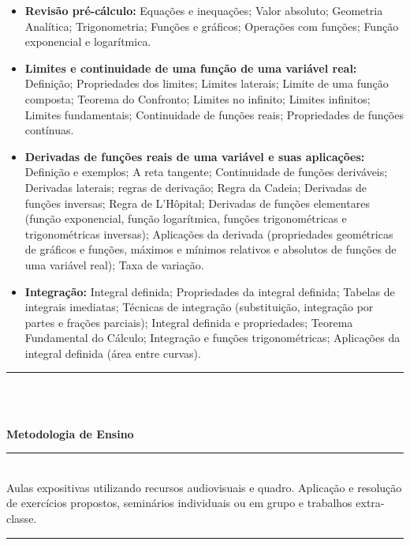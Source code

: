 \begin{itemize}
 \item \textbf{Revisão pré-cálculo:} Equações e inequações; Valor absoluto; Geometria Analítica; Trigonometria; Funções e gráficos; Operações com funções; Função exponencial e logarítmica.
 \item \textbf{Limites e continuidade de uma função de uma variável real:} Definição; Propriedades dos limites; Limites laterais; Limite de uma função composta; Teorema do Confronto; Limites no infinito; Limites infinitos; Limites fundamentais; Continuidade de funções reais; Propriedades de funções contínuas.
 \item \textbf{Derivadas de funções reais de uma variável e suas aplicações:} Definição e exemplos; A reta tangente; Continuidade de funções deriváveis; Derivadas laterais; regras de derivação; Regra da Cadeia; Derivadas de funções inversas; Regra de L'Hôpital; Derivadas de funções elementares (função exponencial, função logarítmica, funções trigonométricas e trigonométricas inversas); Aplicações da derivada (propriedades geométricas de gráficos e funções, máximos e mínimos relativos e absolutos de funções de uma variável real); Taxa de variação.
 \item \textbf{Integração:} Integral definida; Propriedades da integral definida; Tabelas de integrais imediatas; Técnicas de integração (substituição, integração por partes e frações parciais); Integral definida e propriedades; Teorema Fundamental do Cálculo; Integração e funções trigonométricas; Aplicações da integral definida (área entre curvas).
\end{itemize}
\noindent\rule{16.5cm}{0.4pt}\\
\\
\vspace{-12mm}
\begin{center}\textbf{Metodologia de Ensino}\end{center} 
\vspace{-5mm}
\noindent\rule{16.5cm}{0.4pt}
\\
   Aulas expositivas utilizando recursos audiovisuais e quadro. Aplicação e resolução de exercícios propostos, seminários individuais ou em grupo e trabalhos extra-classe.\\
\noindent\rule{16.5cm}{0.4pt}\\
\\
\vspace{-12mm}
